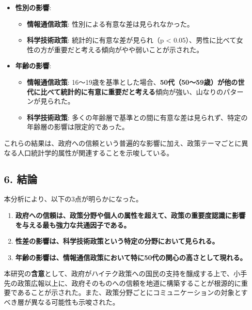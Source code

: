 \documentclass[
  xelatex]{bxjsarticle}
\providecommand{\tightlist}{%
  \setlength{\itemsep}{0pt}\setlength{\parskip}{0pt}}
\begin{document}
\begin{itemize}
\tightlist
\item
  \textbf{性別の影響}:

  \begin{itemize}
  \tightlist
  \item
    \textbf{情報通信政策}: 性別による有意な差は見られなかった。
  \item
    \textbf{科学技術政策}: 統計的に有意な差が見られ（p \textless{}
    0.05）、男性に比べて女性の方が重要だと考える傾向がやや弱いことが示された。
  \end{itemize}
\end{itemize}

\begin{itemize}
\tightlist
\item
  \textbf{年齢の影響}:

  \begin{itemize}
  \tightlist
  \item
    \textbf{情報通信政策}:
    16〜19歳を基準とした場合、\textbf{50代（50〜59歳）が他の世代に比べて統計的に有意に重要だと考える}傾向が強い、山なりのパターンが見られた。
  \item
    \textbf{科学技術政策}:
    多くの年齢層で基準との間に有意な差は見られず、特定の年齢層の影響は限定的であった。
  \end{itemize}
\end{itemize}

これらの結果は、政府への信頼という普遍的な影響に加え、政策テーマごとに異なる人口統計学的属性が関連することを示唆している。

\subsection{6. 結論}\label{ux7d50ux8ad6}

本分析により、以下の3点が明らかになった。

\begin{enumerate}
\def\labelenumi{\arabic{enumi}.}
\tightlist
\item
  \textbf{政府への信頼は、政策分野や個人の属性を超えて、政策の重要度認識に影響を与える最も強力な共通因子である。}
\item
  \textbf{性差の影響は、科学技術政策という特定の分野において見られる。}
\item
  \textbf{年齢の影響は、情報通信政策において特に50代の関心の高さとして現れる。}
\end{enumerate}

本研究の\textbf{含意}として、政府がハイテク政策への国民の支持を醸成する上で、小手先の政策広報以上に、政府そのものへの信頼を地道に構築することが根源的に重要であることが示された。また、政策分野ごとにコミュニケーションの対象とすべき層が異なる可能性も示唆された。
\end{document}
